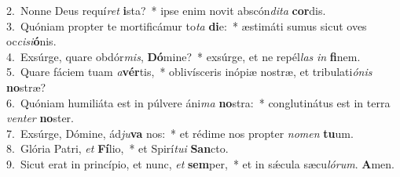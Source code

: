 {2.~}Nonne Deus requí\textit{ret} \textbf{i}sta?~* ipse enim novit abscón\textit{di}\textit{ta} \textbf{cor}dis.\\
{3.~}Quóniam propter te mortificámur to\textit{ta} \textbf{di}e:~* æstimáti sumus sicut oves oc\textit{ci}\textit{si}\textbf{ó}nis.\\
{4.~}Exsúrge, quare obdór\textit{mis}, \textbf{Dó}mine?~* exsúrge, et ne repél\textit{las} \textit{in} \textbf{fi}nem.\\
{5.~}Quare fáciem tuam \textit{a}\textbf{vér}tis,~* oblivísceris inópiæ nostræ, et tribulati\textit{ó}\textit{nis} \textbf{no}stræ?\\
{6.~}Quóniam humiliáta est in púlvere áni\textit{ma} \textbf{no}stra:~* conglutinátus est in terra \textit{ven}\textit{ter} \textbf{no}ster.\\
{7.~}Exsúrge, Dómine, ád\textit{ju}\textbf{va} nos:~* et rédime nos propter \textit{no}\textit{men} \textbf{tu}um.\\
{8.~}Glória Patri, \textit{et} \textbf{Fí}lio,~* et Spirí\textit{tu}\textit{i} \textbf{San}cto.\\
{9.~}Sicut erat in princípio, et nunc, \textit{et} \textbf{sem}per,~* et in sǽcula sæcu\textit{ló}\textit{rum}. \textbf{A}men.\\
